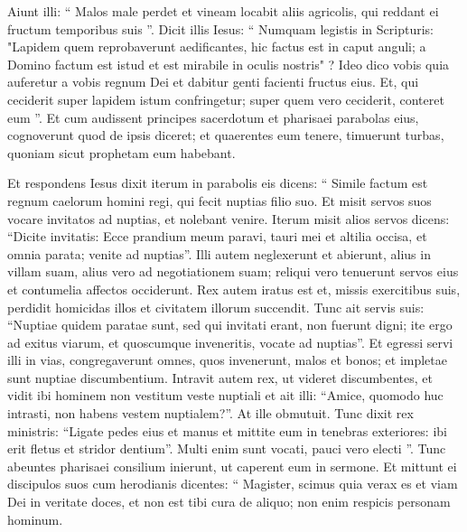 \begin{biblechapter}
\begin{biblechapter}
\begin{biblechapter}
\begin{biblechapter}
\begin{biblechapter}
\begin{biblechapter}
\begin{biblechapter}
\begin{biblechapter}
\begin{biblechapter}
\begin{biblechapter}
\begin{biblechapter}
\begin{biblechapter}
\begin{biblechapter}
\begin{biblechapter}
\begin{biblechapter}
\begin{biblechapter}
\begin{biblechapter}
\begin{biblechapter}
\begin{biblechapter}
\begin{biblechapter}
\begin{biblechapter}
\verse Aiunt illi: “ Malos male perdet et vineam locabit aliis agricolis, qui reddant ei fructum temporibus suis ”. 
\verse Dicit illis Iesus: “ Numquam legistis in Scripturis:
 "Lapidem quem reprobaverunt aedificantes,
 hic factus est in caput anguli;
 a Domino factum est istud
 et est mirabile in oculis nostris" ?
 \verse Ideo dico vobis quia auferetur a vobis regnum Dei et dabitur genti facienti fructus eius. 
\verse Et, qui ceciderit super lapidem istum confringetur; super quem vero ceciderit, conteret eum ”.
 \verse Et cum audissent principes sacerdotum et pharisaei parabolas eius, cognoverunt quod de ipsis diceret; 
\verse et quaerentes eum tenere, timuerunt turbas, quoniam sicut prophetam eum habebant.
 
\begin{biblechapter}
\verse Et respondens Iesus dixit iterum in parabolis eis dicens: 
\verse “ Simile factum est regnum caelorum homini regi, qui fecit nuptias filio suo. 
\verse Et misit servos suos vocare invitatos ad nuptias, et nolebant venire. 
\verse Iterum misit alios servos dicens: “Dicite invitatis: Ecce prandium meum paravi, tauri mei et altilia occisa, et omnia parata; venite ad nuptias”. 
\verse Illi autem neglexerunt et abierunt, alius in villam suam, alius vero ad negotiationem suam; 
\verse reliqui vero tenuerunt servos eius et contumelia affectos occiderunt.
 \verse Rex autem iratus est et, missis exercitibus suis, perdidit homicidas illos et civitatem illorum succendit. 
\verse Tunc ait servis suis: “Nuptiae quidem paratae sunt, sed qui invitati erant, non fuerunt digni; 
\verse ite ergo ad exitus viarum, et quoscumque inveneritis, vocate ad nuptias”. 
\verse Et egressi servi illi in vias, congregaverunt omnes, quos invenerunt, malos et bonos; et impletae sunt nuptiae discumbentium. 
\verse Intravit autem rex, ut videret discumbentes, et vidit ibi hominem non vestitum veste nuptiali 
\verse et ait illi: “Amice, quomodo huc intrasti, non habens vestem nuptialem?”. At ille obmutuit. 
\verse Tunc dixit rex ministris: “Ligate pedes eius et manus et mittite eum in tenebras exteriores: ibi erit fletus et stridor dentium”. 
\verse Multi enim sunt vocati, pauci vero electi ”.
 \verse Tunc abeuntes pharisaei consilium inierunt, ut caperent eum in sermone. 
 \verse Et mittunt ei discipulos suos cum herodianis dicentes: “ Magister, scimus quia verax es et viam Dei in veritate doces, et non est tibi cura de aliquo; non enim respicis personam hominum. 

\end{biblechapter}
\end{biblechapter}
\end{biblechapter}
\end{biblechapter}
\end{biblechapter}
\end{biblechapter}
\end{biblechapter}
\end{biblechapter}
\end{biblechapter}
\end{biblechapter}
\end{biblechapter}
\end{biblechapter}
\end{biblechapter}
\end{biblechapter}
\end{biblechapter}
\end{biblechapter}
\end{biblechapter}
\end{biblechapter}
\end{biblechapter}
\end{biblechapter}
\end{biblechapter}
\end{biblechapter}
